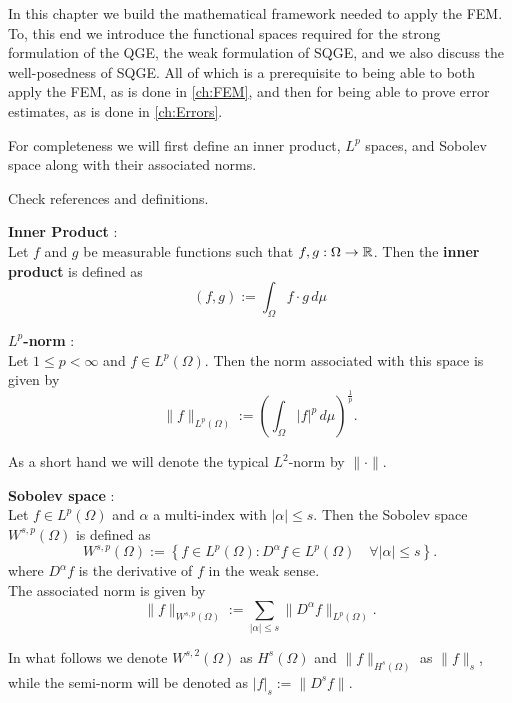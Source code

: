 In this chapter we build the mathematical framework needed to apply the FEM. To,
this end we introduce the functional spaces required for the strong formulation
of the QGE, the weak formulation of SQGE, and we also discuss the well-posedness
of SQGE. All of which is a prerequisite to being able to both apply the FEM, as
is done in \autoref{ch:FEM}, and then for being able to prove error estimates,
as is done in \autoref{ch:Errors}.

For completeness we will first define an inner product, $L^p$ spaces, and
Sobolev space along with their associated norms.

{\color{red} {\LARGE Check references and definitions.}
\begin{definition} \label{def:InnerProduct}
  \textbf{Inner Product} \cite{}: \\
  Let $f$ and $g$ be measurable functions such that $f,g : \Omega \rightarrow \mathbb{R}$.
  Then the \textbf{inner product} is defined as
  \begin{equation}
    (f,g) := \int_{\Omega}\! f \cdot g\, d\mu
    \label{eqn:InnerProduct}
  \end{equation}
\end{definition}

\begin{definition} \label{def:LpNorm}
  \textbf{$L^p$-norm} \cite{}: \\
  Let $1\le p < \infty$ and $f \in L^p(\Omega)$. Then the norm associated with
  this space is given by
  \begin{equation}
    \|f\|_{L^p(\Omega)} := \left(\int_{\Omega}\! |f|^p\, d\mu\right)^{\frac{1}{p}}.
    \label{eqn:LPNorm}
  \end{equation}
\end{definition}
As a short hand we will denote the typical $L^2$-norm by $\|\cdot\|$.

\begin{definition} \label{SobolevSpace}
  \textbf{Sobolev space} \cite{}: \\
  Let $f \in L^p(\Omega)$ and $\alpha$ a multi-index with $|\alpha| \le s$. Then
  the Sobolev space $W^{s,p}(\Omega)$ is defined as
  \begin{equation}
    W^{s,p}(\Omega) := \left\{ f\in L^p(\Omega) : D^{\alpha} f \in
      L^p(\Omega)\quad \forall |\alpha| \le s\right\}.
    \label{eqn:Sobolev}
  \end{equation}
  where $D^{\alpha}f$ is the derivative of $f$ in the weak sense.\\
  The associated norm is given by
  \begin{equation}
    \|f\|_{W^{s,p}(\Omega)} := \sum_{|\alpha|\le s}
      \|D^{\alpha}f\|_{L^p(\Omega)}.
    \label{eqn:HkpNorm}
  \end{equation}
\end{definition}
In what follows we denote $W^{s,2}(\Omega)$ as $H^s(\Omega)$ and
$\|f\|_{H^s(\Omega)}$ as $\|f\|_s$, while the semi-norm will be denoted
as $|f|_s := \|D^s f\|$.}
